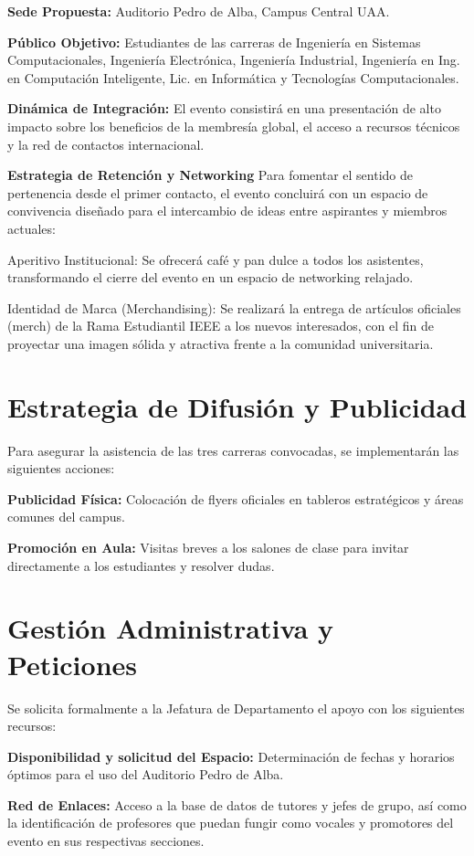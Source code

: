 \documentclass[11pt,a4paper]{article}
\begin{document}
\textbf {Sede Propuesta:} Auditorio Pedro de Alba, Campus Central UAA.

\textbf {Público Objetivo:} Estudiantes de las carreras de Ingeniería en Sistemas Computacionales, Ingeniería Electrónica, Ingeniería Industrial, Ingeniería en Ing. en Computación Inteligente, Lic. en Informática y Tecnologías Computacionales.

\textbf {Dinámica de Integración:} El evento consistirá en una presentación de alto impacto sobre los beneficios de la membresía global, el acceso a recursos técnicos y la red de contactos internacional.

\textbf {Estrategia de Retención y Networking}
Para fomentar el sentido de pertenencia desde el primer contacto, el evento concluirá con un espacio de convivencia diseñado para el intercambio de ideas entre aspirantes y miembros actuales:

Aperitivo Institucional: Se ofrecerá café y pan dulce a todos los asistentes, transformando el cierre del evento en un espacio de networking relajado.

Identidad de Marca (Merchandising): Se realizará la entrega de artículos oficiales (merch) de la Rama Estudiantil IEEE a los nuevos interesados, con el fin de proyectar una imagen sólida y atractiva frente a la comunidad universitaria.

\section{Estrategia de Difusión y Publicidad}

Para asegurar la asistencia de las tres carreras convocadas, se implementarán las siguientes acciones:

\textbf {Publicidad Física:} Colocación de flyers oficiales en tableros estratégicos y áreas comunes del campus.

\textbf {Promoción en Aula: } Visitas breves a los salones de clase para invitar directamente a los estudiantes y resolver dudas.

\section{Gestión Administrativa y Peticiones}
Se solicita formalmente a la Jefatura de Departamento el apoyo con los siguientes recursos:

\textbf {Disponibilidad y solicitud del Espacio:} Determinación de fechas y horarios óptimos para el uso del Auditorio Pedro de Alba.

\textbf {Red de Enlaces:} Acceso a la base de datos de tutores y jefes de grupo, así como la identificación de profesores que puedan fungir como vocales y promotores del evento en sus respectivas secciones.
\end{document}
